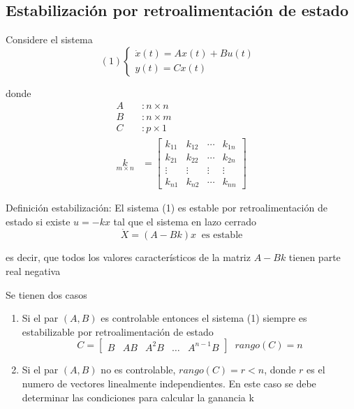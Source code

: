 \subsection{Estabilización por retroalimentación de estado}

Considere el sistema
\[(1)
    \left\{
        \begin{array}{lll}
            \dot{x}(t) = Ax(t) + Bu(t) \\
            y(t) = Cx(t)
        \end{array}
    \right. \;\;
\]

donde 
\[
     \begin{split}
        A &: n\times n \\
        B &: n\times m \\
        C &: p \times 1 \\
        \underset{m \times n}{k} & = 
            \begin{bmatrix}
                k_{11} & k_{12} & \cdots & k_{1n} \\
                k_{21} & k_{22} & \cdots & k_{2n} \\
                \vdots & \vdots & \vdots & \vdots \\
                k_{n1} & k_{n2} & \cdots & k_{nn}
            \end{bmatrix}
    \end{split}
\]

Definición estabilización: El sistema (1) es estable por retroalimentación de estado si existe \( u = -kx \) tal que el sistema en lazo cerrado
\[
    \dot{X} = (A-Bk)x \;\; \text{es estable} 
\]

es decir, que todos los valores característicos de la matriz \( A-Bk \) tienen parte real negativa

Se tienen dos casos 
\begin{enumerate}
    \item Si el par \( (A, B) \) es controlable entonces el sistema (1) siempre es estabilizable por retroalimentación de estado
    \[
        C = \begin{bmatrix}
                B & AB & A^{2}B & \ldots & A^{n-1}B
            \end{bmatrix} \;\; rango(C) = n
    \]
    \item Si el par \( (A, B) \) no es controlable, \( rango(C) = r < n \), donde \( r \) es el numero de vectores linealmente independientes. 
    En este caso se debe determinar las condiciones para calcular la ganancia k
\end{enumerate}

